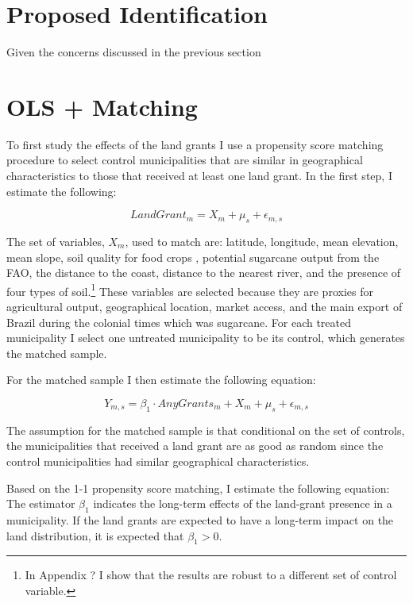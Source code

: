 \documentclass{article}
\begin{document}
\section{Proposed Identification}

Given the concerns discussed in the previous section 

\section{OLS + Matching}

To first study the effects of the land grants I use a propensity score matching procedure to select control municipalities that are similar in geographical characteristics to those that received at least one land grant. In the first step, I estimate the following:

\begin{equation}
  LandGrant_m = X_{m} + \mu_s + \epsilon_{m,s}
\end{equation}

The set of variables, $X_{m}$, used to match are: latitude, longitude, mean elevation, mean slope, soil quality for food crops \parencite{Galor2016-ba}, potential sugarcane output from the FAO, the distance to the coast, distance to the nearest river, and the presence of four types of soil.\footnote{In Appendix ? I show that the results are robust to a different set of control variable.} 
These variables are selected because they are proxies for agricultural output, geographical location, market access, and the main export of Brazil during the colonial times which was sugarcane. 
For each treated municipality I select one untreated municipality to be its control, which generates the matched sample.

For the matched sample I then estimate the following equation:

\begin{equation}
  \label{eqn:ols_matching_all}
  Y_{m,s} = \beta_1 \cdot AnyGrants_m + X_{m} + \mu_s + \epsilon_{m,s}
\end{equation}

The assumption for the matched sample is that conditional on the set of controls, the municipalities that received a land grant are as good as random since the control municipalities had similar geographical characteristics. 


Based on the 1-1 propensity score matching, I estimate the following equation:
The estimator $\beta_1$ indicates the long-term effects of the land-grant presence in a municipality. 
If the land grants are expected to have a long-term impact on the land distribution, it is expected that $\beta_1 > 0$.
\end{document}
